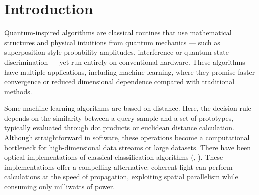 \documentclass[twocolumn]{article} %
\begin{document}
\coverpage




\section{Introduction}

Quantum-inspired algorithms are classical routines that use mathematical structures and physical intuitions from quantum mechanics — such as superposition-style probability amplitudes, interference or quantum state discrimination — yet run entirely on conventional hardware.  
These algorithms have multiple applications, including machine learning, where they promise faster convergence or reduced dimensional dependence compared with traditional methods.

Some machine-learning algorithms are based on distance. 
Here, the decision rule depends on the similarity between a query sample and a set of prototypes, typically evaluated through dot products or euclidean distance calculation.  Although straightforward in software, these operations become a computational bottleneck for high-dimensional data streams or large datasets.  
There have been optical implementations of classical classification algorithms (\cite{Neifeld1993}, \cite{Foor1995}). These implementations offer a compelling alternative: coherent light can perform calculations at the speed of propagation, exploiting spatial parallelism while consuming only milliwatts of power.
\end{document}
